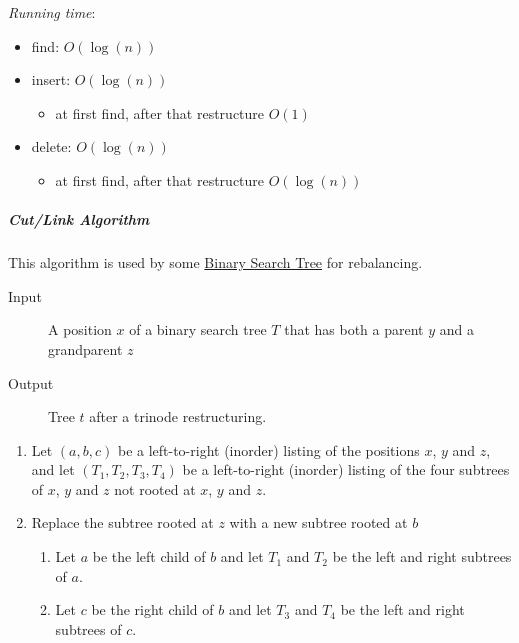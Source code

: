 \documentclass[11pt,twoside,twocolumn,landscape]{article}
\begin{document}
\emph{Running time}:
\begin{itemize}
\item find: \(O(\log (n))\)
\item insert: \(O(\log (n))\)
\begin{itemize}
\item at first find, after that restructure \(O(1)\)
\end{itemize}
\item delete: \(O(\log (n))\)
\begin{itemize}
\item at first find, after that restructure \(O(\log (n))\)
\end{itemize}
\end{itemize}

\subparagraph{Cut/Link Algorithm}
\label{sec:org729a821}
This algorithm is used by some \href{../../../roam/20211008140953-binary_search_tree.org}{Binary Search Tree} for rebalancing. 

\begin{description}
\item[{Input}] A position \(x\) of a binary search tree \(T\) that has both a parent \(y\) and a grandparent \(z\)
\item[{Output}] Tree \(t\) after a trinode restructuring.
\end{description}


\begin{enumerate}
\item Let \((a, b, c)\) be a left-to-right (inorder) listing of the positions \(x\), \(y\) and \(z\), and let \((T_1, T_2, T_3, T_4)\) be a left-to-right (inorder) listing of the four subtrees of \(x\), \(y\) and \(z\) not rooted at \(x\), \(y\) and \(z\).
\item Replace the subtree rooted at \(z\) with a new subtree rooted at \(b\)
\begin{enumerate}
\item Let \(a\) be the left child of \(b\) and let \(T_1\) and \(T_2\) be the left and right subtrees of \(a\).
\item Let \(c\) be the right child of \(b\) and let \(T_3\) and \(T_4\) be the left and right subtrees of \(c\).
\end{enumerate}
\end{enumerate}
\end{document}
